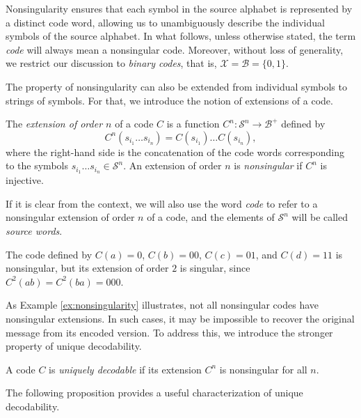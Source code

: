 Nonsingularity ensures that each symbol in the source alphabet is represented by a distinct code word, allowing us to unambiguously describe the individual symbols of the source alphabet. In what follows, unless otherwise stated, the term \emph{code} will always mean a nonsingular code. Moreover, without loss of generality, we restrict our discussion to \emph{binary codes}, that is, $\mathcal{X} = \mathcal{B} = \{0, 1\}$.

The property of nonsingularity can also be extended from individual symbols to strings of symbols. For that, we introduce the notion of extensions of a code.

\begin{definition}
The \emph{extension of order $n$} of a code $C$ is a function $C^{n}:\mathcal{S}^{n}\rightarrow\mathcal{B}^{+}$ defined by
\[
C^{n}(s_{i_1} \ldots s_{i_n}) = C(s_{i_1}) \ldots C(s_{i_n}),
\]
where the right-hand side is the concatenation of the code words corresponding to the symbols $s_{i_1} \ldots s_{i_n} \in \mathcal{S}^{n}$. An extension of order $n$ is \emph{nonsingular} if $C^{n}$ is injective.
\end{definition}

If it is clear from the context, we will also use the word \emph{code} to refer to a nonsingular extension of order $n$ of a code, and the elements of \(\mathcal{S}^{n}\) will be called \emph{source words}.

\begin{example}
\label{ex:nonsingularity}
The code defined by $C(a)=0$, $C(b)=00$, $C(c)=01$, and $C(d)=11$ is nonsingular, but its extension of order $2$ is singular, since $C^2(ab)=C^2(ba)=000$.
\end{example}

As Example \ref{ex:nonsingularity} illustrates, not all nonsingular codes have nonsingular extensions. In such cases, it may be impossible to recover the original message from its encoded version. To address this, we introduce the stronger property of unique decodability.

\begin{definition}
A code $C$ is \emph{uniquely decodable} if its extension $C^{n}$ is nonsingular for all $n$.
\end{definition}

The following proposition provides a useful characterization of unique decodability.

